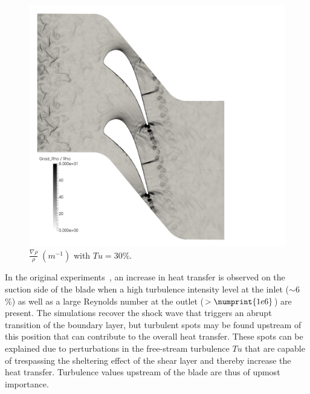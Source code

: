 
\begin{figure}[!h]
\centering
\includegraphics[width=0.7\linewidth,keepaspectratio]{fig/applications/ls89/10_2column_color-online-only_gradRhoRho.pdf}
\caption{$\frac{\nabla \rho}{\rho}\; (m^{-1})$ with $Tu = 30\%$.}
\label{fig:ls89-gradRhoRho}
\end{figure}


In the original experiments~\cite{arts1990}, an increase in heat transfer is observed on the suction side of the blade when a high turbulence intensity level at the inlet ($\sim 6$\%) as well as a large Reynolds number at the outlet ($>\numprint{1e6}$) are present. The simulations recover the shock wave that triggers an abrupt transition of the boundary layer, but turbulent spots may be found upstream of this position that can contribute to the overall heat transfer. These spots can be explained due to perturbations in the free-stream turbulence $Tu$ that are capable of trespassing the sheltering effect of the shear layer and thereby increase the heat transfer. Turbulence values upstream of the blade are thus of upmost importance.

